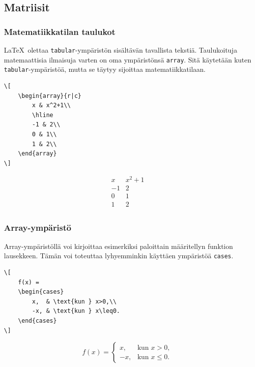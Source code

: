 \subsection{Matriisit}
\begin{frame}[fragile]
    \frametitle{Matematiikkatilan taulukot}
    \LaTeX\ olettaa \verb-tabular--ympäristön sisältävän tavallista tekstiä. Taulukoituja matemaattisia ilmaisuja varten on oma ympäristönsä \verb-array-. Sitä käytetään kuten \verb-tabular--ympäristöä, mutta se täytyy sijoittaa matematiikkatilaan.\vaihto

    \begin{minipage}{5cm}
        \begin{scriptsize}
            \begin{Verbatim}[frame=single]
\[
    \begin{array}{r|c}
        x & x^2+1\\
        \hline
        -1 & 2\\
        0 & 1\\
        1 & 2\\
    \end{array}
\]
            \end{Verbatim}
        \end{scriptsize}
    \end{minipage}
    \begin{minipage}{3cm}
        \[
        \begin{array}{r|c}
            x & x^2+1\\
            \hline
            -1 & 2\\
            0 & 1\\
            1 & 2\\
        \end{array}
        \]
    \end{minipage}
\end{frame}
\begin{frame}[fragile]
    \frametitle{Array-ympäristö}
    Array-ympäristöllä voi kirjoittaa esimerkiksi paloittain määritellyn funktion lausekkeen. Tämän voi toteuttaa lyhyemminkin käyttäen ympäristöä \verb-cases-. 
    \begin{Verbatim}[frame=single]
\[
    f(x) =
    \begin{cases}
        x,  & \text{kun } x>0,\\
        -x, & \text{kun } x\leq0.
    \end{cases}
\]
    \end{Verbatim}
    \begin{sample}
        \[
            f(x) =
            \begin{cases}
                x,  & \text{kun } x>0,\\
                -x, & \text{kun } x\leq0.
            \end{cases}
        \]
    \end{sample}
\end{frame}
